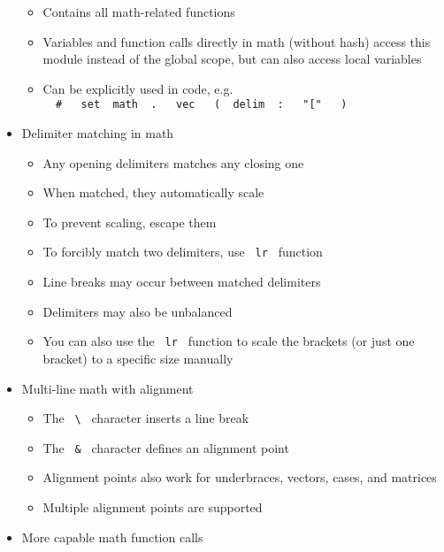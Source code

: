 \begin{itemize}
  \begin{itemize}
  \tightlist
  \item
    Contains all math-related functions
  \item
    Variables and function calls directly in math (without hash) access
    this module instead of the global scope, but can also access local
    variables
  \item
    Can be explicitly used in code, e.g.
    \texttt{\ }{\texttt{\ \#\ }}\texttt{\ }{\texttt{\ set\ }}\texttt{\ math\ }{\texttt{\ .\ }}\texttt{\ }{\texttt{\ vec\ }}\texttt{\ }{\texttt{\ (\ }}\texttt{\ delim\ }{\texttt{\ :\ }}\texttt{\ }{\texttt{\ "{[}"\ }}\texttt{\ }{\texttt{\ )\ }}\texttt{\ }
  \end{itemize}
\item
  Delimiter matching in math

  \begin{itemize}
  \tightlist
  \item
    Any opening delimiters matches any closing one
  \item
    When matched, they automatically scale
  \item
    To prevent scaling, escape them
  \item
    To forcibly match two delimiters, use \texttt{\ lr\ } function
  \item
    Line breaks may occur between matched delimiters
  \item
    Delimiters may also be unbalanced
  \item
    You can also use the \texttt{\ lr\ } function to scale the brackets
    (or just one bracket) to a specific size manually
  \end{itemize}
\item
  Multi-line math with alignment

  \begin{itemize}
  \tightlist
  \item
    The \texttt{\ \textbackslash{}\ } character inserts a line break
  \item
    The \texttt{\ \&\ } character defines an alignment point
  \item
    Alignment points also work for underbraces, vectors, cases, and
    matrices
  \item
    Multiple alignment points are supported
  \end{itemize}
\item
  More capable math function calls


\end{itemize}
